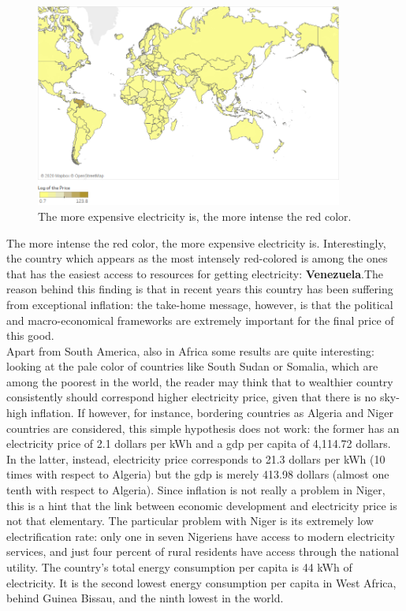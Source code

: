 \documentclass{book}
\begin{document}
\bigskip
\begin{figure}[H]
\begin{center}
\captionsetup{justification=centering}
\includegraphics[width=0.9\textwidth]{Images/world2020.png}
\caption{The more expensive electricity is, the more intense the red color. }
\end{center}
\end{figure}
\bigskip

The more intense the red color, the more expensive electricity is. Interestingly, the country which appears as the most intensely red-colored is among the ones that has the easiest access to resources for getting electricity: \textbf{Venezuela}.The reason behind this finding is that in recent years this country has been suffering from exceptional inflation: the take-home message, however, is that the political and macro-economical frameworks are extremely important for the final price of this good.\\

Apart from South America, also in Africa some results are quite interesting: looking at the pale color of countries like South Sudan or Somalia, which are among the poorest in the world, the reader may think that to wealthier country consistently should correspond higher electricity price, given that there is no sky-high inflation. If however, for instance, bordering countries as Algeria and Niger countries are considered, this simple hypothesis does not work: the former has an electricity price of 2.1 dollars per kWh and a gdp per capita of 4,114.72 dollars. In the latter, instead, electricity price corresponds to 21.3 dollars per kWh (10 times with respect to Algeria) but the gdp is merely 413.98 dollars (almost one tenth with respect to Algeria). Since inflation is not really a problem in Niger, this is a hint that the link between economic development and electricity price is not that elementary. The particular problem with Niger is its extremely low electrification rate: only one in seven Nigeriens have access to modern electricity services, and just four percent of rural residents have access through the national utility. The country's total energy consumption per capita is 44 kWh of electricity. It is the second lowest energy consumption per capita in West Africa, behind Guinea Bissau, and the ninth lowest in the world. 
\end{document}
